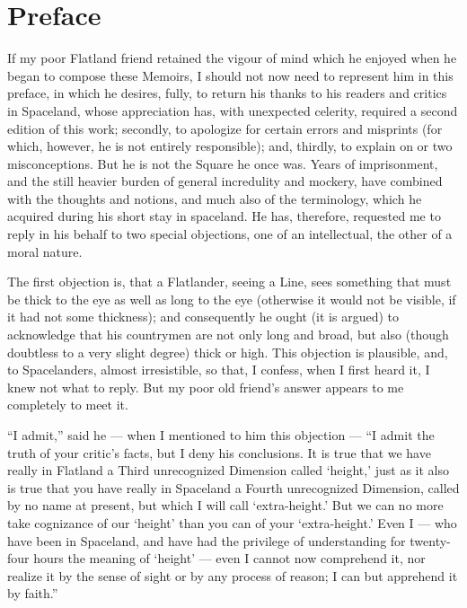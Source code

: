 \documentclass[12pt, a4paper, oneside]{memoir}
\begin{document}
\chapter*{Preface}
If my poor Flatland friend retained the vigour of mind which he enjoyed when
he began to compose these Memoirs, I should not now need to represent him in
this preface, in which he desires, fully, to return his thanks to his readers
and critics in Spaceland, whose appreciation has, with unexpected celerity,
required a second edition of this work; secondly, to apologize for certain
errors and misprints (for which, however, he is not entirely responsible);
and, thirdly, to explain on or two misconceptions. But he is not the Square he
once was. Years of imprisonment, and the still heavier burden of general
incredulity and mockery, have combined with the thoughts and notions, and much
also of the terminology, which he acquired during his short stay in spaceland.
He has, therefore, requested me to reply in his behalf to two special
objections, one of an intellectual, the other of a moral nature.

The first objection is, that a Flatlander, seeing a Line, sees something that
must be thick to the eye as well as long to the eye (otherwise it would not be
visible, if it had not some thickness); and consequently he ought (it is
argued) to acknowledge that his countrymen are not only long and broad, but
also (though doubtless to a very slight degree) thick or high. This objection
is plausible, and, to Spacelanders, almost irresistible, so that, I confess,
when I first heard it, I knew not what to reply. But my poor old friend's
answer appears to me completely to meet it.

``I admit,'' said he --- when I mentioned to him this objection --- ``I admit the
truth of your critic's facts, but I deny his conclusions. It is true that we
have really in Flatland a Third unrecognized Dimension called `height,' just
as it also is true that you have really in Spaceland a Fourth unrecognized
Dimension, called by no name at present, but which I will call `extra-height.'
But we can no more take cognizance of our `height' than you can of your
`extra-height.' Even I --- who have been in Spaceland, and have had the
privilege of understanding for twenty-four hours the meaning of `height' ---
even I cannot now comprehend it, nor realize it by the sense of sight or by
any process of reason; I can but apprehend it by faith.''
\end{document}
